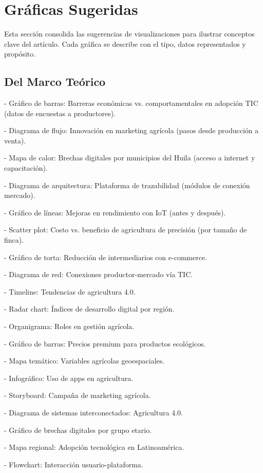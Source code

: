 \section{Gráficas Sugeridas}

Esta sección consolida las sugerencias de visualizaciones para ilustrar conceptos clave del artículo. Cada gráfica se describe con el tipo, datos representados y propósito.

\subsection{Del Marco Teórico}

- Gráfico de barras: Barreras económicas vs. comportamentales en adopción TIC (datos de encuestas a productores).

- Diagrama de flujo: Innovación en marketing agrícola (pasos desde producción a venta).

- Mapa de calor: Brechas digitales por municipios del Huila (acceso a internet y capacitación).

- Diagrama de arquitectura: Plataforma de trazabilidad (módulos de conexión mercado).

- Gráfico de líneas: Mejoras en rendimiento con IoT (antes y después).

- Scatter plot: Costo vs. beneficio de agricultura de precisión (por tamaño de finca).

- Gráfico de torta: Reducción de intermediarios con e-commerce.

- Diagrama de red: Conexiones productor-mercado vía TIC.

- Timeline: Tendencias de agricultura 4.0.

- Radar chart: Índices de desarrollo digital por región.

- Organigrama: Roles en gestión agrícola.

- Gráfico de barras: Precios premium para productos ecológicos.

- Mapa temático: Variables agrícolas geoespaciales.

- Infográfico: Uso de apps en agricultura.

- Storyboard: Campaña de marketing agrícola.

- Diagrama de sistemas interconectados: Agricultura 4.0.

- Gráfico de brechas digitales por grupo etario.

- Mapa regional: Adopción tecnológica en Latinoamérica.

- Flowchart: Interacción usuario-plataforma.

